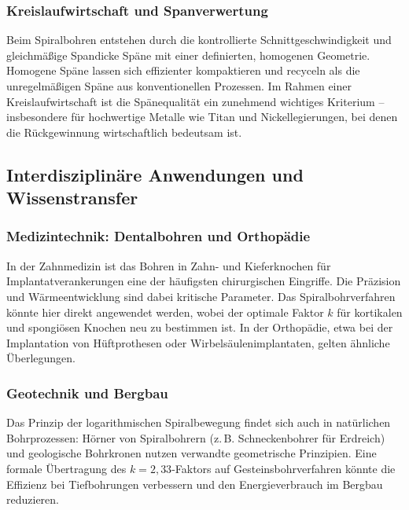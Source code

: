 ﻿\documentclass[12pt,a4paper]{article}
\begin{document}
\subsubsection{Kreislaufwirtschaft und Spanverwertung}

Beim Spiralbohren entstehen durch die kontrollierte Schnittgeschwindigkeit und gleichmäßige Spandicke Späne mit einer definierten, homogenen Geometrie. Homogene Späne lassen sich effizienter kompaktieren und recyceln als die unregelmäßigen Späne aus konventionellen Prozessen. Im Rahmen einer Kreislaufwirtschaft ist die Spänequalität ein zunehmend wichtiges Kriterium -- insbesondere für hochwertige Metalle wie Titan und Nickellegierungen, bei denen die Rückgewinnung wirtschaftlich bedeutsam ist.

\subsection{Interdisziplinäre Anwendungen und Wissenstransfer}

\subsubsection{Medizintechnik: Dentalbohren und Orthopädie}

In der Zahnmedizin ist das Bohren in Zahn- und Kieferknochen für Implantatverankerungen eine der häufigsten chirurgischen Eingriffe. Die Präzision und Wärmeentwicklung sind dabei kritische Parameter. Das Spiralbohrverfahren könnte hier direkt angewendet werden, wobei der optimale Faktor $k$ für kortikalen und spongiösen Knochen neu zu bestimmen ist. In der Orthopädie, etwa bei der Implantation von Hüftprothesen oder Wirbelsäulenimplantaten, gelten ähnliche Überlegungen.

\subsubsection{Geotechnik und Bergbau}

Das Prinzip der logarithmischen Spiralbewegung findet sich auch in natürlichen Bohrprozessen: Hörner von Spiralbohrern (z.\,B. Schneckenbohrer für Erdreich) und geologische Bohrkronen nutzen verwandte geometrische Prinzipien. Eine formale Übertragung des $k = 2{,}33$-Faktors auf Gesteinsbohrverfahren könnte die Effizienz bei Tiefbohrungen verbessern und den Energieverbrauch im Bergbau reduzieren.
\end{document}
